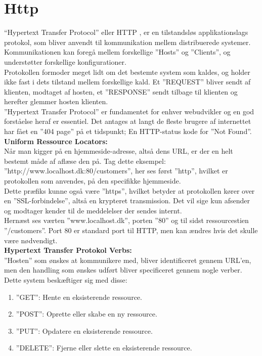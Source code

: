 \section{Http}\label{sec:http}
“Hypertext Transfer Protocol” eller HTTP \cite{HTTP}, er en tilstandsløs applikationslags protokol, 
som bliver anvendt til kommunikation mellem distribuerede systemer. 
Kommunikationen kan foregå mellem forskellige ”Hosts” og ”Clients”, 
og understøtter forskellige konfigurationer.\\

Protokollen formoder meget lidt om det bestemte system som kaldes, 
og holder ikke fast i dets tilstand mellem forskellige kald. 
Et ”REQUEST” bliver sendt af klienten, modtaget af hosten, 
et ”RESPONSE” sendt tilbage til klienten og herefter glemmer hosten klienten. \\

”Hypertext Transfer Protocol” er fundamentet for enhver webudvikler 
og en god forståelse heraf er essentiel. 
Det antages at langt de fleste brugere af internettet har fået en ”404 page” på et tidspunkt; 
En HTTP-status kode for ”Not Found”. \\

\textbf{Uniform Ressource Locators:}\\
Når man kigger på en hjemmeside-adresse, altså dens URL, 
er der en helt bestemt måde af aflæse den på. 
Tag dette eksempel: ”http://www.localhost.dk:80/customers”, 
her ses først ”http”, hvilket er protokollen som anvendes, på den specifikke hjemmeside. \\

Dette præfiks kunne også være ”https”, 
hvilket betyder at protokollen kører over en ”SSL-forbindelse”, 
altså en krypteret transmission. 
Det vil sige kun afsender og modtager kender til de meddelelser der sendes internt. \\

Hernæst ses værten ”www.localhost.dk”, porten ”80” og til sidst ressourcestien ”/customers”. 
Port 80 er standard port til HTTP, men kan ændres hvis det skulle være nødvendigt. \\

\textbf{Hypertext Transfer Protokol Verbs:} \\
”Hosten” som ønskes at kommunikere med, bliver identificeret gennem URL’en, 
men den handling som ønskes udført bliver specificeret gennem nogle verber. 
Dette system beskæftiger sig med disse: \\
\begin{enumerate}
    \item ”GET”: Hente en eksisterende ressource.
    \item ”POST”: Oprette eller skabe en ny ressource.
    \item ”PUT”: Opdatere en eksisterende ressource.
    \item ”DELETE”:  Fjerne eller slette en eksisterende ressource.
\end{enumerate}

